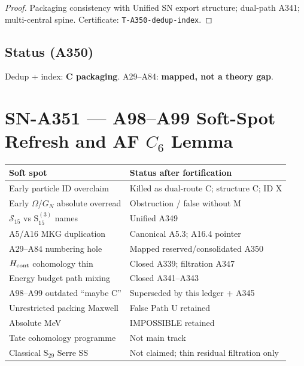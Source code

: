 \begin{proof}
Packaging consistency with Unified SN export structure; dual-path A341; multi-central spine. Certificate: \texttt{T-A350-dedup-index}.
\end{proof}

\subsection*{Status (A350)}
Dedup + index: \textbf{C packaging}. A29--A84: \textbf{mapped, not a theory gap}.

\section{SN-A351 --- A98--A99 Soft-Spot Refresh and AF $C_6$ Lemma}
\label{sec:SN-A351}

\begin{theorem}
\label{thm:A351-ledger}
\begin{center}
\begin{tabular}{@{}p{5.0cm}p{7.0cm}@{}}
\toprule
Soft spot & Status after fortification \\
\midrule
Early particle ID overclaim & Killed as dual-route C; structure C; ID X \\
Early $\Omega$/$G_N$ absolute overread & Obstruction / false without M \\
$\mathcal{S}_{15}$ vs $\mathrm{S}_{15}^{(3)}$ names & Unified A349 \\
A5/A16 MKG duplication & Canonical A5.3; A16.4 pointer \\
A29--A84 numbering hole & Mapped reserved/consolidated A350 \\
$H_{\rm cont}$ cohomology thin & Closed A339; filtration A347 \\
Energy budget path mixing & Closed A341--A343 \\
A98--A99 outdated ``maybe C'' & Superseded by this ledger + A345 \\
Unrestricted packing Maxwell & False Path U retained \\
Absolute MeV & IMPOSSIBLE retained \\
Tate cohomology programme & Not main track \\
Classical $\mathrm{S}_{29}$ Serre SS & Not claimed; thin residual filtration only \\
\bottomrule
\end{tabular}
\end{center}
\end{theorem}

